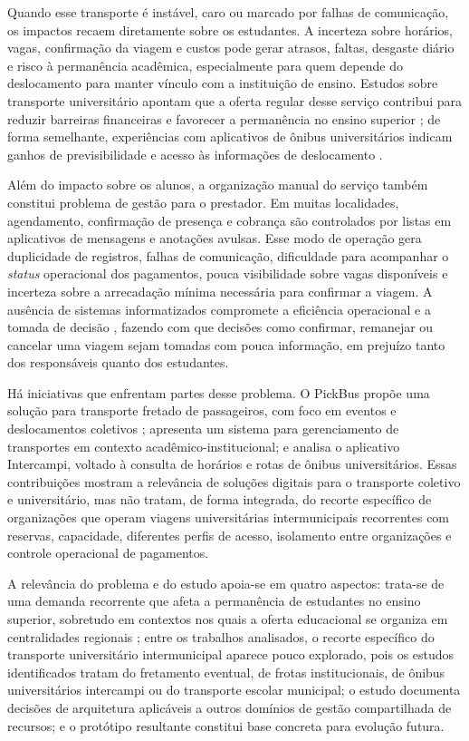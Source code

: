 \documentclass[a4paper,12pt]{article}
\begin{document}
Quando esse transporte é instável, caro ou marcado por falhas de comunicação, os impactos recaem diretamente sobre os estudantes. A incerteza sobre horários, vagas, confirmação da viagem e custos pode gerar atrasos, faltas, desgaste diário e risco à permanência acadêmica, especialmente para quem depende do deslocamento para manter vínculo com a instituição de ensino. Estudos sobre transporte universitário apontam que a oferta regular desse serviço contribui para reduzir barreiras financeiras e favorecer a permanência no ensino superior \cite{silva2022transporteUniversitario}; de forma semelhante, experiências com aplicativos de ônibus universitários indicam ganhos de previsibilidade e acesso às informações de deslocamento \cite{bizerril2024intercampi}.

Além do impacto sobre os alunos, a organização manual do serviço também constitui problema de gestão para o prestador. Em muitas localidades, agendamento, confirmação de presença e cobrança são controlados por listas em aplicativos de mensagens e anotações avulsas. Esse modo de operação gera duplicidade de registros, falhas de comunicação, dificuldade para acompanhar o \textit{status} operacional dos pagamentos, pouca visibilidade sobre vagas disponíveis e incerteza sobre a arrecadação mínima necessária para confirmar a viagem. A ausência de sistemas informatizados compromete a eficiência operacional e a tomada de decisão \cite{reis2021transporte}, fazendo com que decisões como confirmar, remanejar ou cancelar uma viagem sejam tomadas com pouca informação, em prejuízo tanto dos responsáveis quanto dos estudantes.

Há iniciativas que enfrentam partes desse problema. O PickBus propõe uma solução para transporte fretado de passageiros, com foco em eventos e deslocamentos coletivos \cite{pickbus2021};  apresenta um sistema para gerenciamento de transportes em contexto acadêmico-institucional; e  analisa o aplicativo Intercampi, voltado à consulta de horários e rotas de ônibus universitários. Essas contribuições mostram a relevância de soluções digitais para o transporte coletivo e universitário, mas não tratam, de forma integrada, do recorte específico de organizações que operam viagens universitárias intermunicipais recorrentes com reservas, capacidade, diferentes perfis de acesso, isolamento entre organizações e controle operacional de pagamentos.

A relevância do problema e do estudo apoia-se em quatro aspectos: trata-se de uma demanda recorrente que afeta a permanência de estudantes no ensino superior, sobretudo em contextos nos quais a oferta educacional se organiza em centralidades regionais \cite{ibgeRegic2020EnsinoSuperior,silva2022transporteUniversitario}; entre os trabalhos analisados, o recorte específico do transporte universitário intermunicipal aparece pouco explorado, pois os estudos identificados tratam do fretamento eventual, de frotas institucionais, de ônibus universitários intercampi ou do transporte escolar municipal; o estudo documenta decisões de arquitetura aplicáveis a outros domínios de gestão compartilhada de recursos; e o protótipo resultante constitui base concreta para evolução futura.
\end{document}
